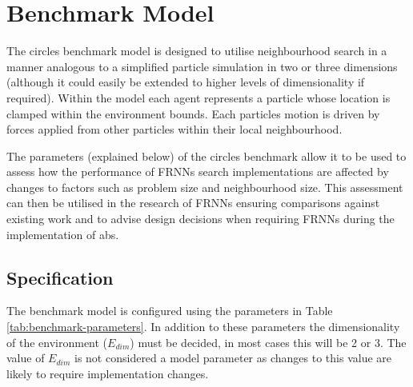 \section{Benchmark Model\label{sec:benchmark-model}}
  The circles benchmark model is designed to utilise neighbourhood search in a manner analogous to a simplified particle simulation in two or three dimensions (although it could easily be extended to higher levels of dimensionality if required). Within the model each agent represents a particle whose location is clamped within the environment bounds. Each particles motion is driven by forces applied from other particles within their local neighbourhood.
   
  The parameters (explained below) of the circles benchmark allow it to be used to assess how the performance of FRNNs search implementations are affected by changes to factors such as problem size and neighbourhood size. This assessment can then be utilised in the research of FRNNs ensuring comparisons against existing work and to advise design decisions when requiring FRNNs during the implementation of \gls{abs}.
  
  \subsection{Specification}  
    The benchmark model is configured using the parameters in Table \ref{tab:benchmark-parameters}. In addition to these parameters the dimensionality of the environment ($E_{dim}$) must be decided, in most cases this will be 2 or 3. The value of $E_{dim}$ is not considered a model parameter as changes to this value are likely to require implementation changes.


